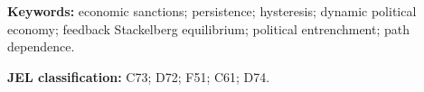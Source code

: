 \documentclass[11pt]{article}
\begin{document}
\medskip
\noindent\textbf{Keywords:} economic sanctions; persistence;
hysteresis; dynamic political economy; feedback Stackelberg equilibrium;
political entrenchment; path dependence.

\smallskip
\noindent\textbf{JEL classification:} C73; D72; F51; C61; D74.





\end{document}
